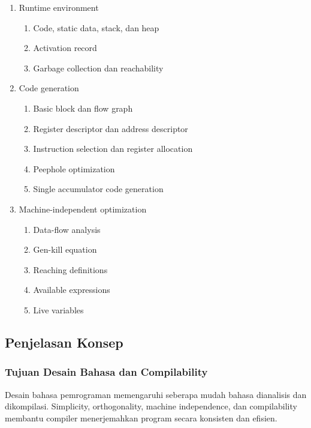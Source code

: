 \begin{enumerate}
\begin{enumerate}
        \item \pwajib Type checking, coercion, dan overloading
    \end{enumerate}
    \item \pwajib Runtime environment
    \begin{enumerate}
        \item \pwajib Code, static data, stack, dan heap
        \item \pwajib Activation record
        \item \ppaham Garbage collection dan reachability
    \end{enumerate}
    \item \pwajib Code generation
    \begin{enumerate}
        \item \pwajib Basic block dan flow graph
        \item \pwajib Register descriptor dan address descriptor
        \item \ppaham Instruction selection dan register allocation
        \item \ppaham Peephole optimization
        \item \ppaham Single accumulator code generation
    \end{enumerate}
    \item \pwajib Machine-independent optimization
    \begin{enumerate}
        \item \pwajib Data-flow analysis
        \item \pwajib Gen-kill equation
        \item \pwajib Reaching definitions
        \item \pwajib Available expressions
        \item \pwajib Live variables
    \end{enumerate}
\end{enumerate}

\subsection{Penjelasan Konsep}

\subsubsection{Tujuan Desain Bahasa dan Compilability}

\begin{jawab}
Desain bahasa pemrograman memengaruhi seberapa mudah bahasa dianalisis dan dikompilasi. Simplicity, orthogonality, machine independence, dan compilability membantu compiler menerjemahkan program secara konsisten dan efisien.
\end{jawab}

